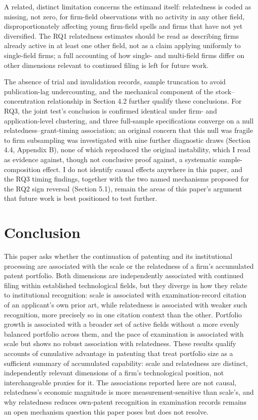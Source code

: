 \documentclass[12pt]{article}
\begin{document}
A related, distinct limitation concerns the estimand itself: relatedness is coded as missing, not zero, for firm-field observations with no activity in any other field, disproportionately affecting young firm-field spells and firms that have not yet diversified. The RQ1 relatedness estimates should be read as describing firms already active in at least one other field, not as a claim applying uniformly to single-field firms; a full accounting of how single- and multi-field firms differ on other dimensions relevant to continued filing is left for future work.

The absence of trial and invalidation records, sample truncation to avoid publication-lag undercounting, and the mechanical component of the stock--concentration relationship in Section 4.2 further qualify these conclusions. For RQ3, the joint test's conclusion is confirmed identical under firm- and application-level clustering, and three full-sample specifications converge on a null relatedness--grant-timing association; an original concern that this null was fragile to firm subsampling was investigated with nine further diagnostic draws (Section 4.4, Appendix B), none of which reproduced the original instability, which I read as evidence against, though not conclusive proof against, a systematic sample-composition effect. I do not identify causal effects anywhere in this paper, and the RQ3 timing findings, together with the two named mechanisms proposed for the RQ2 sign reversal (Section 5.1), remain the areas of this paper's argument that future work is best positioned to test further.

\section{Conclusion}

This paper asks whether the continuation of patenting and its institutional processing are associated with the scale or the relatedness of a firm's accumulated patent portfolio. Both dimensions are independently associated with continued filing within established technological fields, but they diverge in how they relate to institutional recognition: scale is associated with examination-record citation of an applicant's own prior art, while relatedness is associated with weaker such recognition, more precisely so in one citation context than the other. Portfolio growth is associated with a broader set of active fields without a more evenly balanced portfolio across them, and the pace of examination is associated with scale but shows no robust association with relatedness. These results qualify accounts of cumulative advantage in patenting that treat portfolio size as a sufficient summary of accumulated capability: scale and relatedness are distinct, independently relevant dimensions of a firm's technological position, not interchangeable proxies for it. The associations reported here are not causal, relatedness's economic magnitude is more measurement-sensitive than scale's, and why relatedness reduces own-patent recognition in examination records remains an open mechanism question this paper poses but does not resolve.
\end{document}
